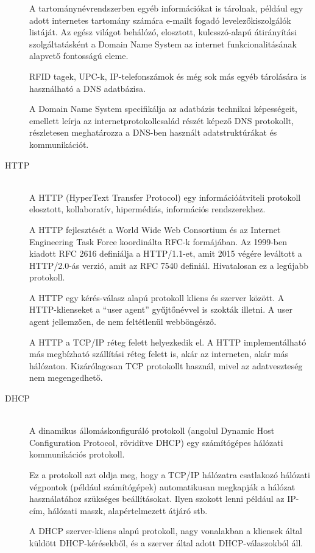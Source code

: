 \documentclass[margin=0px]{article}
\begin{document}
\begin{description}
        A tartománynévrendszerben egyéb információkat is tárolnak, például egy adott internetes tartomány számára e-mailt fogadó levelezőkiszolgálók listáját. Az egész világot behálózó, elosztott, kulcsszó-alapú átirányítási szolgáltatásként a Domain Name System az internet funkcionalitásának alapvető fontosságú eleme.

        RFID tagek, UPC-k, IP-telefonszámok és még sok más egyéb tárolására is használható a DNS adatbázisa.

        A Domain Name System specifikálja az adatbázis technikai képességeit, emellett leírja az internetprotokollcsalád részét képező DNS protokollt, részletesen meghatározza a DNS-ben használt adatstruktúrákat és kommunikációt.

    \item[HTTP] \hfill \\
        A HTTP (HyperText Transfer Protocol) egy információátviteli protokoll elosztott, kollaboratív, hipermédiás, információs rendszerekhez.

        A HTTP fejlesztését a World Wide Web Consortium és az Internet Engineering Task Force koordinálta RFC-k formájában. Az 1999-ben kiadott RFC 2616 definiálja a HTTP/1.1-et, amit 2015 végére leváltott a HTTP/2.0-ás verzió, amit az RFC 7540 definiál. Hivatalosan ez a legújabb protokoll.

        A HTTP egy kérés-válasz alapú protokoll kliens és szerver között. A HTTP-klienseket a ``user agent'' gyűjtőnévvel is szokták illetni. A user agent jellemzően, de nem feltétlenül webböngésző.

        A HTTP a TCP/IP réteg felett helyezkedik el. A HTTP implementálható más megbízható szállítási réteg felett is, akár az interneten, akár más hálózaton. Kizárólagosan TCP protokollt használ, mivel az adatveszteség nem megengedhető.
    \item[DHCP] \hfill \\
        A dinamikus állomáskonfiguráló protokoll (angolul Dynamic Host Configuration Protocol, rövidítve DHCP) egy számítógépes hálózati kommunikációs protokoll.

        Ez a protokoll azt oldja meg, hogy a TCP/IP hálózatra csatlakozó hálózati végpontok (például számítógépek) automatikusan megkapják a hálózat használatához szükséges beállításokat. Ilyen szokott lenni például az IP-cím, hálózati maszk, alapértelmezett átjáró stb.

        A DHCP szerver-kliens alapú protokoll, nagy vonalakban a kliensek által küldött DHCP-kérésekből, és a szerver által adott DHCP-válaszokból áll.


\end{description}
\end{document}
